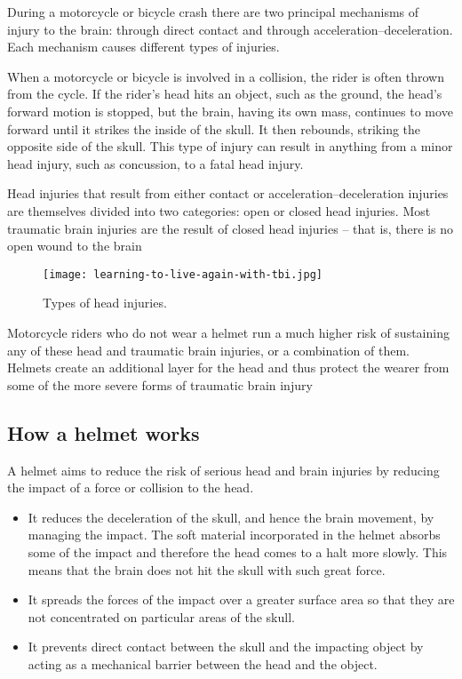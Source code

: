 During a motorcycle or bicycle crash there are two principal mechanisms of injury to the brain: through
direct contact and through acceleration–deceleration. Each mechanism causes different types of injuries.
\vspace{.5cm}

When a motorcycle or bicycle is involved in a collision, the rider is often thrown from the cycle. If the
rider’s head hits an object, such as the ground, the head’s forward motion is stopped, but the brain,
having its own mass, continues to move forward until it strikes the inside of the skull. It then rebounds,
striking the opposite side of the skull. This type of injury can result in anything from a minor head
injury, such as concussion, to a fatal head injury.
\vspace{.5cm}

Head injuries that result from either contact or acceleration–deceleration injuries are themselves divided
into two categories: open or closed head injuries. Most traumatic brain injuries are the result of closed
head injuries – that is, there is no open wound to the brain

\begin{figure}[h]
	\centering
	\texttt{[image: learning-to-live-again-with-tbi.jpg]}
	\caption{Types of head injuries.}
\end{figure}

Motorcycle riders who do not wear a helmet run a much higher risk of sustaining any of these head and
traumatic brain injuries, or a combination of them. Helmets create an additional layer for the head and
thus protect the wearer from some of the more severe forms of traumatic brain injury

\subsection{How a helmet works}
A helmet aims to reduce the risk of serious head and brain injuries by reducing the impact of a force or
collision to the head.
\begin{itemize}
	\item It reduces the deceleration of the skull, and hence the brain movement, by managing the impact. The
	soft material incorporated in the helmet absorbs some of the impact and therefore the head comes to a
	halt more slowly. This means that the brain does not hit the skull with such great force.
	\item It spreads the forces of the impact over a greater surface area so that they are not concentrated on
	particular areas of the skull.
	\item It prevents direct contact between the skull and the impacting object by acting as a mechanical barrier
	between the head and the object.
\end{itemize}

